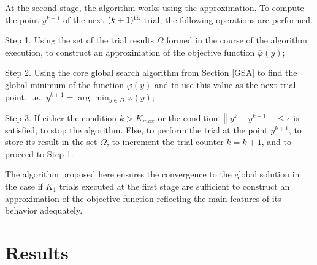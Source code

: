 \documentclass[mathematics,article,accept,pdftex,moreauthors]{Definitions/mdpi}
\begin{document}
At the second stage, the algorithm works using the approximation. To compute the point $y^{k+1}$ of the next $(k+1)^{\rm th}$ trial, the following operations are performed.

Step 1. Using the set of the trial results $\Omega$ formed in the course of the algorithm execution, to construct an approximation of the objective function $\overline{\varphi}(y)$;

Step 2. Using the core global search algorithm from Section \ref{GSA} to find the global minimum of the function $\overline{\varphi}(y)$ and to use this value as the next trial point, i.e., $y^{k+1} = \arg \min_{y \in D} \overline{\varphi}(y)$;

Step 3. If either the condition $k>K_{max}$ or the condition $\left\|y^k - y^{k+1}\right\| \leq \epsilon$ is satisfied, to stop the algorithm.
Else, to perform the trial at the point $y^{k+1}$, to store its result in the set $\Omega$, to increment the trial counter $k = k+1$, and to proceed to Step 1.


The algorithm proposed here ensures the convergence to the global solution in the case if $K_1$ trials executed at the first stage are sufficient to construct an approximation of the objective function reflecting the main features of its behavior adequately.




\section{Results}\label{sec5}




\end{document}
